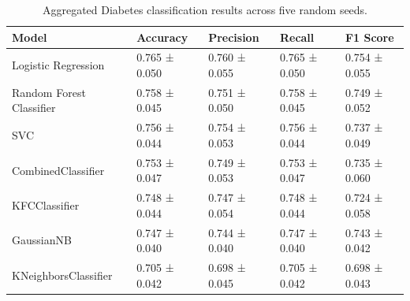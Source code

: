 \begin{table}
\caption{Aggregated Diabetes classification results across five random seeds.}
\label{tab:diabetes_aggregated_results}
\begin{tabular}{lllll}
\toprule
Model & Accuracy & Precision & Recall & F1 Score \\
\midrule
Logistic Regression & 0.765 ± 0.050 & 0.760 ± 0.055 & 0.765 ± 0.050 & 0.754 ± 0.055 \\
Random Forest Classifier & 0.758 ± 0.045 & 0.751 ± 0.050 & 0.758 ± 0.045 & 0.749 ± 0.052 \\
SVC & 0.756 ± 0.044 & 0.754 ± 0.053 & 0.756 ± 0.044 & 0.737 ± 0.049 \\
CombinedClassifier & 0.753 ± 0.047 & 0.749 ± 0.053 & 0.753 ± 0.047 & 0.735 ± 0.060 \\
KFCClassifier & 0.748 ± 0.044 & 0.747 ± 0.054 & 0.748 ± 0.044 & 0.724 ± 0.058 \\
GaussianNB & 0.747 ± 0.040 & 0.744 ± 0.040 & 0.747 ± 0.040 & 0.743 ± 0.042 \\
KNeighborsClassifier & 0.705 ± 0.042 & 0.698 ± 0.045 & 0.705 ± 0.042 & 0.698 ± 0.043 \\
\bottomrule
\end{tabular}
\end{table}
